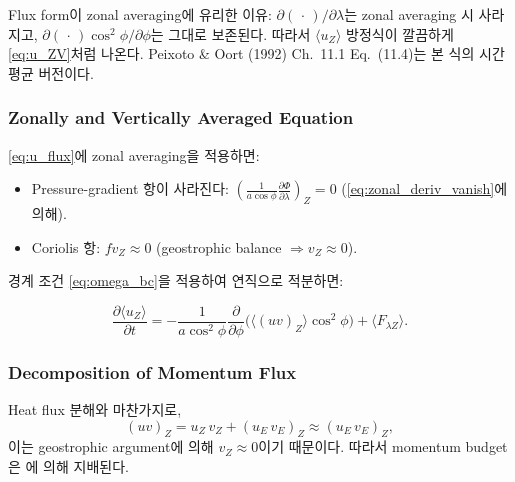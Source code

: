 \begin{hisublock}
Flux form이 zonal averaging에 유리한 이유: $\partial(\,\cdot\,)/\partial\lambda$는
zonal averaging 시 사라지고, $\partial(\,\cdot\,)\cos^2\phi/\partial\phi$는 그대로
보존된다.  따라서 $\langle u_Z\rangle$ 방정식이 깔끔하게 \eqref{eq:u_ZV}처럼
나온다.  Peixoto \& Oort (1992) Ch.~11.1 Eq.~(11.4)는 본 식의 시간평균 버전이다.
\end{hisublock}

\subsubsection{Zonally and Vertically Averaged Equation}

\eqref{eq:u_flux}에 zonal averaging을 적용하면:
\begin{itemize}
  \item Pressure-gradient 항이 사라진다:
    $\displaystyle\left(\frac{1}{a\cos\phi}\frac{\partial\Phi}{\partial\lambda}\right)_Z = 0$
    (\eqref{eq:zonal_deriv_vanish}에 의해).
  \item Coriolis 항: $f v_Z \approx 0$ (geostrophic balance $\Rightarrow v_Z \approx 0$).
\end{itemize}

\noindent
경계 조건 \eqref{eq:omega_bc}을 적용하여 연직으로 적분하면:

\begin{equation}\label{eq:u_ZV}
  \boxed{
  \frac{\partial\langle u_Z\rangle}{\partial t}
  = -\frac{1}{a\cos^2\phi}\frac{\partial}{\partial\phi}
    \bigl(\langle(uv)_Z\rangle\cos^2\phi\bigr)
    + \langle F_{\lambda Z}\rangle.
  }
\end{equation}


\subsubsection{Decomposition of Momentum Flux}

Heat flux 분해와 마찬가지로,
\begin{equation}\label{eq:mom_flux_decomp}
  (uv)_Z = u_Z\,v_Z + (u_E\,v_E)_Z \approx (u_E\,v_E)_Z,
\end{equation}
이는 geostrophic argument에 의해 $v_Z \approx 0$이기 때문이다.  따라서 momentum budget은
에 의해 지배된다.

